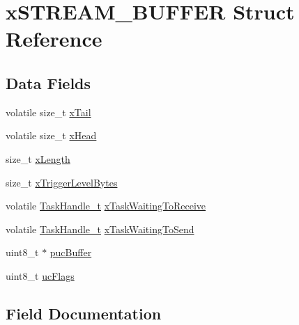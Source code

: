 \hypertarget{structx_s_t_r_e_a_m___b_u_f_f_e_r}{}\section{x\+S\+T\+R\+E\+A\+M\+\_\+\+B\+U\+F\+F\+ER Struct Reference}
\label{structx_s_t_r_e_a_m___b_u_f_f_e_r}
\subsection*{Data Fields}
\begin{DoxyCompactItemize}
\item 
volatile size\+\_\+t \mbox{\hyperlink{structx_s_t_r_e_a_m___b_u_f_f_e_r_a6eedf625958216bba9136d98dcfed196}{x\+Tail}}
\item 
volatile size\+\_\+t \mbox{\hyperlink{structx_s_t_r_e_a_m___b_u_f_f_e_r_a003e281d830468b1faabf4ba820f5ad0}{x\+Head}}
\item 
size\+\_\+t \mbox{\hyperlink{structx_s_t_r_e_a_m___b_u_f_f_e_r_a1ba6056c7e598ac40b4542c3b1614315}{x\+Length}}
\item 
size\+\_\+t \mbox{\hyperlink{structx_s_t_r_e_a_m___b_u_f_f_e_r_a9cc97a6ea4374a84aa4d1453459ffce4}{x\+Trigger\+Level\+Bytes}}
\item 
volatile \mbox{\hyperlink{task_8h_ae95f44d4cfeb4a599c6cc258d241cb6b}{Task\+Handle\+\_\+t}} \mbox{\hyperlink{structx_s_t_r_e_a_m___b_u_f_f_e_r_aae9dce0a57e217492d5511b8f728d165}{x\+Task\+Waiting\+To\+Receive}}
\item 
volatile \mbox{\hyperlink{task_8h_ae95f44d4cfeb4a599c6cc258d241cb6b}{Task\+Handle\+\_\+t}} \mbox{\hyperlink{structx_s_t_r_e_a_m___b_u_f_f_e_r_adcac505e0e57d53096673aae517ba651}{x\+Task\+Waiting\+To\+Send}}
\item 
uint8\+\_\+t $\ast$ \mbox{\hyperlink{structx_s_t_r_e_a_m___b_u_f_f_e_r_aa8c28e51282198825d5ad0c2d666623a}{puc\+Buffer}}
\item 
uint8\+\_\+t \mbox{\hyperlink{structx_s_t_r_e_a_m___b_u_f_f_e_r_ab8f6da769d17b9653e9a6d879e875e9b}{uc\+Flags}}
\end{DoxyCompactItemize}


\subsection{Field Documentation}
\mbox{\label{structx_s_t_r_e_a_m___b_u_f_f_e_r_aa8c28e51282198825d5ad0c2d666623a}} 
